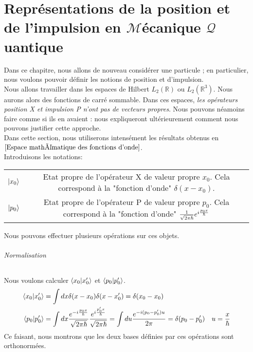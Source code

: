 \documentclass[../notesdecours.tex]{subfiles}
\begin{document}
\part{Représentations de la position et de l'impulsion en $\mathcal{M}$écanique $\mathcal{Q}$uantique}
Dans ce chapitre, nous allons de nouveau considérer une particule ; en particulier, nous voulons pouvoir définir les notions de position et d'impulsion.\\

Nous allons travailler dans les espaces de Hilbert $L_2(\mathbb{R})$ ou $L_2 (\mathbb{R}^3)$. Nous aurons alors des fonctions de carré sommable. Dans ces espaces, \emph{les opérateurs position X et impulsion P n'ont pas de vecteurs propres}. Nous pouvons néamoins faire comme si ils en avaient : nous expliqueront ultérieurement comment nous pouvons justifier cette approche.\\

Dans cette section, nous utiliserons intensément les résultats obtenus en $\ref{Espace mathématique des fonctions d'onde}$.\\

Introduisons les notations:
\begin{center}
\begin{tabular}{c|c}
$\ket{x_0} $ & Etat propre de l'opérateur X de valeur propre $x_0$. Cela correspond à la "fonction d'onde" $\delta(x-x_0)$.\\
$\ket{p_0} $ & Etat propre de l'opérateur P de valeur propre $p_0$. Cela correspond à la "fonction d'onde" $\frac{1}{\sqrt{2\pi\hbar}}e^{i \frac{p_0 x}{\hbar}}$
\end{tabular}
\end{center}

Nous pouvons effectuer plusieurs opérations sur ces objets. 

\paragraph{Normalisation}
Nous voulons calculer $\braket{x_0|x_0'}$ et $\braket{p_0|p_0'}$. 
	\begin{align*}
\braket{x_0|x_0'} &= \int dx \delta (x-x_0)\delta(x-x_0') = \delta (x_0 - x_0)\\
\braket{p_0|p_0'} &= \int dx \frac{e^{-i \frac{p_0 x}{\hbar}}}{\sqrt{2\pi\hbar}} \frac{e^{i \frac{p_0'x}{\hbar}}}{\sqrt{2\pi\hbar}} = \int du \frac{e^{-i (p_0 - p_0')u}}{2\pi}	= \delta (p_0-p_0')	&u = \frac{x}{\hbar}\\
	\end{align*}
Ce faisant, nous montrons que les deux bases définies par ces opérations sont orthonormées.
\end{document}
